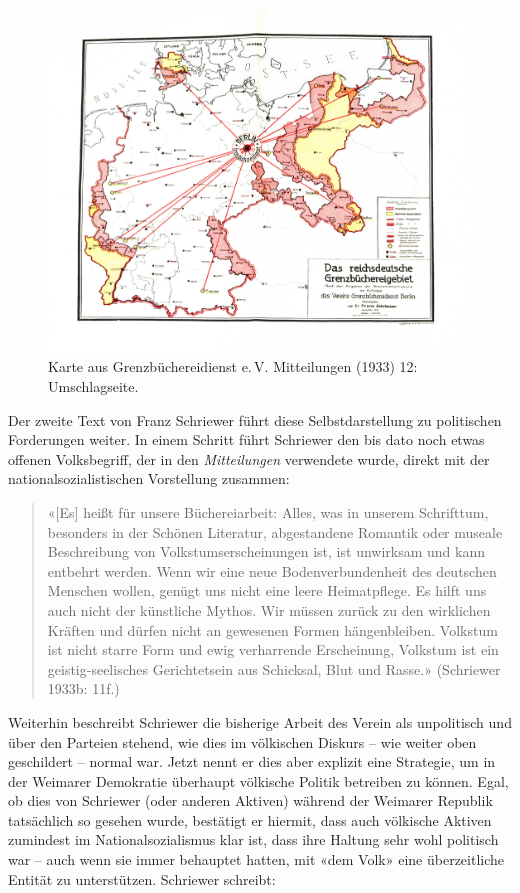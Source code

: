 \documentclass[a4paper,
fontsize=11pt,
oneside,
numbers=noperiodatend,
parskip=half-,
bibliography=totoc,
final
]{scrartcl}
\begin{document}
\begin{figure}
\centering
\includegraphics{img/karte_reichsdeutsche.jpg}
\caption{Karte aus Grenzbüchereidienst e.\,V. Mitteilungen (1933) 12:
Umschlagseite.}
\end{figure}

Der zweite Text von Franz Schriewer führt diese Selbstdarstellung zu
politischen Forderungen weiter. In einem Schritt führt Schriewer den bis
dato noch etwas offenen Volksbegriff, der in den \emph{Mitteilungen}
verwendete wurde, direkt mit der nationalsozialistischen Vorstellung
zusammen:

\begin{quote}
«{[}Es{]} heißt für unsere Büchereiarbeit: Alles, was in unserem
Schrifttum, besonders in der Schönen Literatur, abgestandene Romantik
oder museale Beschreibung von Volkstumserscheinungen ist, ist unwirksam
und kann entbehrt werden. Wenn wir eine neue Bodenverbundenheit des
deutschen Menschen wollen, genügt uns nicht eine leere Heimatpflege. Es
hilft uns auch nicht der künstliche Mythos. Wir müssen zurück zu den
wirklichen Kräften und dürfen nicht an gewesenen Formen hängenbleiben.
Volkstum ist nicht starre Form und ewig verharrende Erscheinung,
Volkstum ist ein geistig-seelisches Gerichtetsein aus Schicksal, Blut
und Rasse.» (Schriewer 1933b: 11f.)
\end{quote}

Weiterhin beschreibt Schriewer die bisherige Arbeit des Verein als
unpolitisch und über den Parteien stehend, wie dies im völkischen
Diskurs -- wie weiter oben geschildert -- normal war. Jetzt nennt er
dies aber explizit eine Strategie, um in der Weimarer Demokratie
überhaupt völkische Politik betreiben zu können. Egal, ob dies von
Schriewer (oder anderen Aktiven) während der Weimarer Republik
tatsächlich so gesehen wurde, bestätigt er hiermit, dass auch völkische
Aktiven zumindest im Nationalsozialismus klar ist, dass ihre Haltung
sehr wohl politisch war -- auch wenn sie immer behauptet hatten, mit
«dem Volk» eine überzeitliche Entität zu unterstützen. Schriewer
schreibt:
\end{document}
